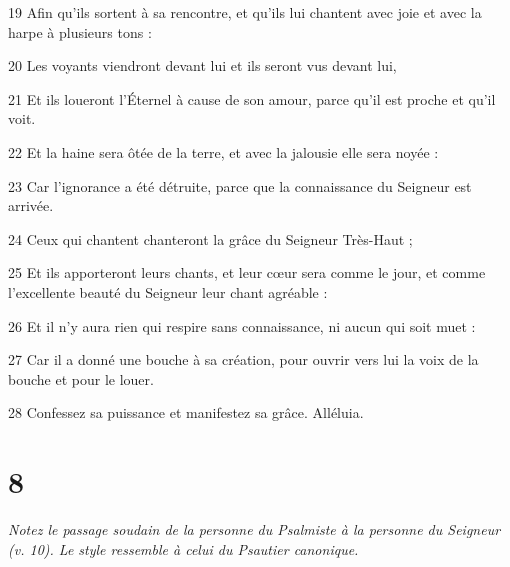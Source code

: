 \par 19 Afin qu'ils sortent à sa rencontre, et qu'ils lui chantent avec joie et avec la harpe à plusieurs tons :
\par 20 Les voyants viendront devant lui et ils seront vus devant lui,
\par 21 Et ils loueront l'Éternel à cause de son amour, parce qu'il est proche et qu'il voit.
\par 22 Et la haine sera ôtée de la terre, et avec la jalousie elle sera noyée :
\par 23 Car l'ignorance a été détruite, parce que la connaissance du Seigneur est arrivée.
\par 24 Ceux qui chantent chanteront la grâce du Seigneur Très-Haut ;
\par 25 Et ils apporteront leurs chants, et leur cœur sera comme le jour, et comme l'excellente beauté du Seigneur leur chant agréable :
\par 26 Et il n'y aura rien qui respire sans connaissance, ni aucun qui soit muet :
\par 27 Car il a donné une bouche à sa création, pour ouvrir vers lui la voix de la bouche et pour le louer.
\par 28 Confessez sa puissance et manifestez sa grâce. Alléluia.

\chapter{8}

\par \textit{Notez le passage soudain de la personne du Psalmiste à la personne du Seigneur (v. 10). Le style ressemble à celui du Psautier canonique.}

